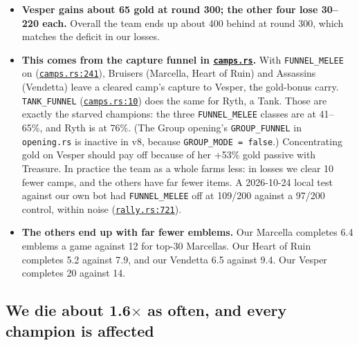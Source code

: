 \documentclass[11pt,a4paper]{article}
\newcommand{\repo}{file:///Users/tristanbasri/Desktop/Code/cambridge-battlecode-s2}
\newcommand{\code}[2]{\href{\repo/#1}{\texttt{\textcolor{cOurs!80!black}{#2}}}}
\newcommand{\veight}{bots/bot-v8/src}
\begin{document}
\begin{itemize}
  \item \textbf{Vesper gains about 65 gold at round 300; the other four lose 30--220 each.} Overall the team ends up about 400 behind at round 300, which matches the deficit in our losses.
  \item \textbf{This comes from the capture funnel in \code{\veight/common/camps.rs}{camps.rs}.} With \texttt{FUNNEL\_MELEE} on (\code{\veight/common/camps.rs}{camps.rs:241}), Bruisers (Marcella, Heart of Ruin) and Assassins (Vendetta) leave a cleared camp's capture to Vesper, the gold-bonus carry. \texttt{TANK\_FUNNEL} (\code{\veight/common/camps.rs}{camps.rs:10}) does the same for Ryth, a Tank. Those are exactly the starved champions: the three \texttt{FUNNEL\_MELEE} classes are at 41--65\%, and Ryth is at 76\%. (The Group opening's \texttt{GROUP\_FUNNEL} in \texttt{opening.rs} is inactive in v8, because \texttt{GROUP\_MODE = false}.) Concentrating gold on Vesper should pay off because of her +53\% gold passive with Treasure. In practice the team as a whole farms less: in losses we clear 10 fewer camps, and the others have far fewer items. A 2026-10-24 local test against our own bot had \texttt{FUNNEL\_MELEE} off at 109/200 against a 97/200 control, within noise (\code{\veight/common/rally.rs}{rally.rs:721}).
  \item \textbf{The others end up with far fewer emblems.} Our Marcella completes 6.4 emblems a game against 12 for top-30 Marcellas. Our Heart of Ruin completes 5.2 against 7.9, and our Vendetta 6.5 against 9.4. Our Vesper completes 20 against 14.
\end{itemize}

\subsection{We die about 1.6\texorpdfstring{$\times$}{x} as often, and every champion is affected}
\end{document}
